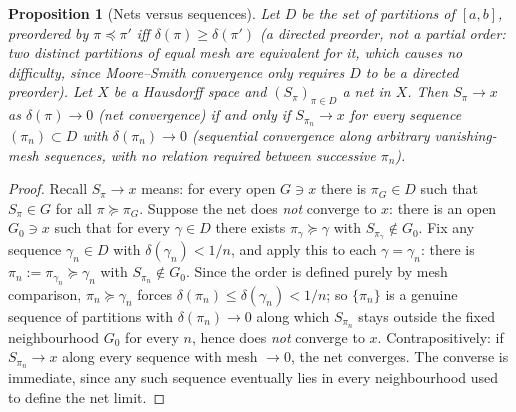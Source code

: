 \documentclass[11pt,fleqn]{article}
\theoremstyle{plain}
\newtheorem{proposition}[thm]{Proposition}
\theoremstyle{remark}
\begin{document}
\begin{proposition}[Nets versus sequences]\label{rem:net-vs-seq}
Let $D$ be the set of partitions of $[a,b]$, preordered by
$\pi\preceq\pi'$ iff $\delta(\pi)\ge\delta(\pi')$ (a directed preorder,
not a partial order: two distinct partitions of equal mesh are
equivalent for it, which causes no difficulty, since Moore--Smith
convergence only requires $D$ to be a directed preorder). Let $X$ be a
Hausdorff space and $(S_\pi)_{\pi\in D}$ a net in $X$. Then $S_\pi\to x$
as $\delta(\pi)\to0$ (net convergence) if and only if $S_{\pi_n}\to x$
for every sequence $(\pi_n)\subset D$ with $\delta(\pi_n)\to0$
(sequential convergence along arbitrary vanishing-mesh sequences, with
no relation required between successive $\pi_n$).
\end{proposition}
\begin{proof}
Recall $S_\pi\to x$ means: for every open $G\ni x$ there is $\pi_G\in D$
such that $S_\pi\in G$ for all $\pi\succeq\pi_G$. Suppose the net does
\emph{not} converge to $x$: there is an open $G_0\ni x$ such that for
every $\gamma\in D$ there exists $\pi_\gamma\succeq\gamma$ with
$S_{\pi_\gamma}\notin G_0$. Fix any sequence $\gamma_n\in D$ with
$\delta(\gamma_n)<1/n$, and apply this to each $\gamma=\gamma_n$: there
is $\pi_n:=\pi_{\gamma_n}\succeq\gamma_n$ with $S_{\pi_n}\notin G_0$.
Since the order is defined purely by mesh comparison,
$\pi_n\succeq\gamma_n$ forces $\delta(\pi_n)\le\delta(\gamma_n)<1/n$; so
$\{\pi_n\}$ is a genuine sequence of partitions with $\delta(\pi_n)\to0$
along which $S_{\pi_n}$ stays outside the fixed neighbourhood $G_0$ for
every $n$, hence does \emph{not} converge to $x$. Contrapositively: if
$S_{\pi_n}\to x$ along every sequence with mesh $\to0$, the net
converges. The converse is immediate, since any such sequence eventually
lies in every neighbourhood used to define the net limit.
\end{proof}
\end{document}

